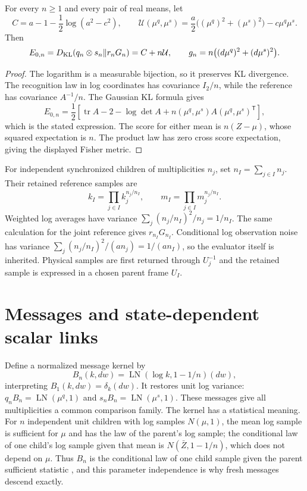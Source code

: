 For every $n\geq1$ and every pair of real means, let
\begin{equation}
 C=a-1-\frac12\log(a^2-c^2),\qquad
 \mathcal U(\mu^q,\mu^s)
 =\frac a2\bigl((\mu^q)^2+(\mu^s)^2\bigr)-c\mu^q\mu^s.
\end{equation}
Then
\begin{equation}
 E_{0,n}=D_{\mathrm{KL}}(q_n\otimes s_n\|r_nG_n)
 =C+n\mathcal U,\qquad
 g_n=n\bigl((d\mu^q)^2+(d\mu^s)^2\bigr).
 \label{fus:local-formulas}
\end{equation}
\begin{proof}
The logarithm is a measurable bijection, so it preserves KL divergence.
The recognition law in log coordinates has covariance $I_2/n$, while the
reference has covariance $A^{-1}/n$. The Gaussian KL formula gives
\begin{equation}
 E_{0,n}=\frac12\left[
 \operatorname{tr}A-2-\log\det A
 +n(\mu^q,\mu^s)A(\mu^q,\mu^s)^{\mathsf T}\right],
\end{equation}
which is the stated expression. The score for either mean is
$n(Z-\mu)$, whose squared expectation is $n$. The product law has zero
cross score expectation, giving the displayed Fisher metric.
\end{proof}

For independent synchronized children of multiplicities $n_j$, set
$n_I=\sum_{j\in I}n_j$. Their retained reference samples are
\begin{equation}
 k_I=\prod_{j\in I}k_j^{n_j/n_I},\qquad
 m_I=\prod_{j\in I}m_j^{n_j/n_I}.
 \label{fus:sample-retention}
\end{equation}
Weighted log averages have variance
$\sum_j(n_j/n_I)^2/n_j=1/n_I$. The same calculation for the joint
reference gives $r_{n_I}G_{n_I}$. Conditional log observation noise has
variance $\sum_j(n_j/n_I)^2/(an_j)=1/(an_I)$, so the evaluator itself
is inherited. Physical samples are first returned through $U_j^{-1}$ and
the retained sample is expressed in a chosen parent frame $U_I$.

\section{Messages and state-dependent scalar links}

Define a normalized message kernel by
\begin{equation}
 B_n(k,dw)=\operatorname{LN}(\log k,1-1/n)(dw),
 \label{fus:message-kernel}
\end{equation}
interpreting $B_1(k,dw)=\delta_k(dw)$. It restores unit log variance:
$q_nB_n=\operatorname{LN}(\mu^q,1)$ and
$s_nB_n=\operatorname{LN}(\mu^s,1)$. These messages give all multiplicities
a common comparison family. The kernel has a statistical meaning. For $n$
independent unit children with log samples $N(\mu,1)$, the mean log sample is
sufficient for $\mu$ and has the law of the parent's log sample; the
conditional law of one child's log sample given that mean is
$N(\bar Z,1-1/n)$, which does not depend on $\mu$. Thus $B_n$ is the
conditional law of one child sample given the parent sufficient statistic
\cite{AyJostLeSchwachhofer2015}, and this parameter independence is why fresh
messages descend exactly.

